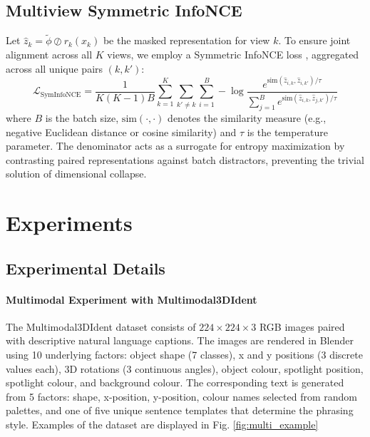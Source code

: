 \documentclass[a4paper,12pt]{article}
\begin{document}
\subsection{Multiview Symmetric InfoNCE}
Let $\hat{z}_k = \tilde{\phi} \oslash r_k(x_k)$ be the masked representation for view $k$. To ensure joint alignment across all $K$ views, we employ a Symmetric InfoNCE loss \cite{oord2019representationlearningcontrastivepredictive, radford2021learning}, aggregated across all unique pairs $(k, k')$:
\begin{equation}
  \mathcal{L}_{\text{SymInfoNCE}} = \frac{1}{K(K-1)B} \sum_{k=1}^K \sum_{k' \neq k} \sum_{i=1}^B -\log \frac{e^{\text{sim}(\hat{z}_{i,k}, \hat{z}_{i,k'})/\tau}}{\sum_{j=1}^B e^{\text{sim}(\hat{z}_{i,k}, \hat{z}_{j,k'})/\tau}}
\end{equation}
where $B$ is the batch size, $\text{sim}(\cdot, \cdot)$ denotes the similarity measure (e.g., negative Euclidean distance or cosine similarity) and $\tau$ is the temperature parameter. The denominator acts as a surrogate for entropy maximization by contrasting paired representations against batch distractors, preventing the trivial solution of dimensional collapse.

\section{Experiments} \label{app:Exp}

\subsection{Experimental Details} \label{app:ExpDetails}

\paragraph{Multimodal Experiment with Multimodal3DIdent} The Multimodal3DIdent dataset \cite{daunhawer2023identifiabilityresultsmultimodalcontrastive} consists of $224 \times 224 \times 3$ RGB images paired with descriptive natural language captions. The images are rendered in Blender using 10 underlying factors: object shape (7 classes), x and y positions (3 discrete values each), 3D rotations (3 continuous angles), object colour, spotlight position, spotlight colour, and background colour. The corresponding text is generated from 5 factors: shape, x-position, y-position, colour names selected from random palettes, and one of five unique sentence templates that determine the phrasing style. Examples of the dataset are displayed in Fig. \ref{fig:multi_example}
\end{document}
